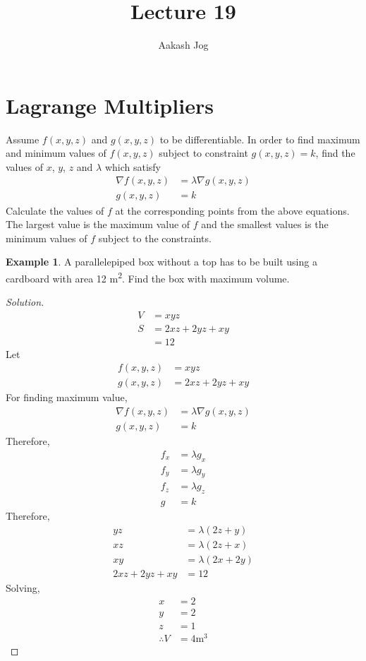 \documentclass[fleqn, a4paper, 12pt]{article}
\title{Lecture 19}
\author{Aakash Jog}
\date{\formatdate{4}{1}{2015}}
\theoremstyle{definition}
\newtheorem{example}{Example}
\theoremstyle{theorem}
\theoremstyle{remark}
\newenvironment{solution}
{\begin{proof}[Solution]\let\qed\relax}
	{\end{proof}}
\begin{document}
	
\maketitle

\tableofcontents

\newpage

\section{Lagrange Multipliers}

Assume $f(x,y,z)$ and $g(x,y,z)$ to be differentiable. In order to find maximum and minimum values of $f(x,y,z)$ subject to constraint $g(x,y,z) = k$, find the values of $x$, $y$, $z$ and $\lambda$ which satisfy
\begin{align*}
	\nabla f(x,y,z) &= \lambda \nabla g(x,y,z)\\
	g(x,y,z) &= k
\end{align*}
Calculate the values of $f$ at the corresponding points from the above equations. The largest value is the maximum value of $f$ and the smallest values is the minimum values of $f$ subject to the constraints.

\begin{example}
	A parallelepiped box without a top has to be built using a cardboard with area 12 \si{\square\metre}. Find the box with maximum volume.
\end{example}

\begin{solution}
	\begin{align*}
		V &= x y z\\
		S &= 2 x z + 2 y z + x y\\
		&= 12
	\end{align*}
	Let
	\begin{align*}
		f(x,y,z) &= x y z\\
		g(x,y,z) &= 2 x z + 2 y z + x y
	\end{align*}
	For finding maximum value,
	\begin{align*}
		\nabla f(x,y,z) &= \lambda \nabla g(x,y,z)\\
		g(x,y,z) &= k
	\end{align*}
	Therefore,
	\begin{align*}
		f_x &= \lambda g_x\\
		f_y &= \lambda g_y\\
		f_z &= \lambda g_z\\
		g &= k
	\end{align*}
	Therefore,
	\begin{align*}
		y z &= \lambda (2z + y)\\
		x z &= \lambda (2 z + x)\\
		x y &= \lambda (2x + 2y)\\
		2 x z + 2 y z + x y &= 12
	\end{align*}
	Solving,
	\begin{align*}
		x &= 2\\
		y &= 2\\
		z &= 1\\
		\therefore V &= 4 \si{\cubic\metre}
	\end{align*}
\end{solution}
\end{document}
